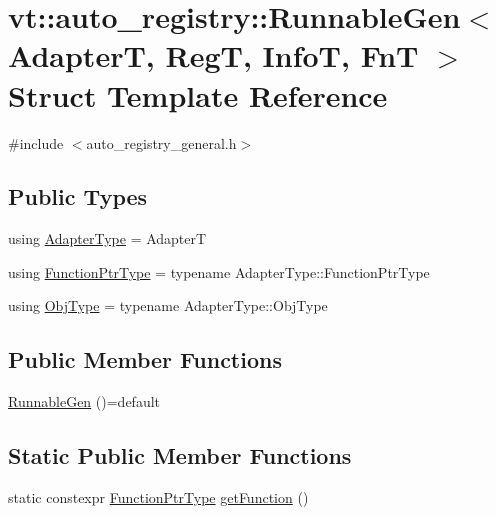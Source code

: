 \hypertarget{structvt_1_1auto__registry_1_1_runnable_gen}{}\section{vt\+:\+:auto\+\_\+registry\+:\+:Runnable\+Gen$<$ AdapterT, RegT, InfoT, FnT $>$ Struct Template Reference}
\label{structvt_1_1auto__registry_1_1_runnable_gen}


{\ttfamily \#include $<$auto\+\_\+registry\+\_\+general.\+h$>$}

\subsection*{Public Types}
\begin{DoxyCompactItemize}
\item 
using \hyperlink{structvt_1_1auto__registry_1_1_runnable_gen_a19d340c580c1b042a173e22650f88cd7}{Adapter\+Type} = AdapterT
\item 
using \hyperlink{structvt_1_1auto__registry_1_1_runnable_gen_a5e4295a0af4d2d89a37687c63afb0591}{Function\+Ptr\+Type} = typename Adapter\+Type\+::\+Function\+Ptr\+Type
\item 
using \hyperlink{structvt_1_1auto__registry_1_1_runnable_gen_ac44cce5cd9a9d7bb5fc473c960240522}{Obj\+Type} = typename Adapter\+Type\+::\+Obj\+Type
\end{DoxyCompactItemize}
\subsection*{Public Member Functions}
\begin{DoxyCompactItemize}
\item 
\hyperlink{structvt_1_1auto__registry_1_1_runnable_gen_a4c000355ca5c5713f7dea025a2babce3}{Runnable\+Gen} ()=default
\end{DoxyCompactItemize}
\subsection*{Static Public Member Functions}
\begin{DoxyCompactItemize}
\item 
static constexpr \hyperlink{structvt_1_1auto__registry_1_1_runnable_gen_a5e4295a0af4d2d89a37687c63afb0591}{Function\+Ptr\+Type} \hyperlink{structvt_1_1auto__registry_1_1_runnable_gen_a96a55abd9ec0504cb8c567b1e95807d0}{get\+Function} ()
\end{DoxyCompactItemize}
